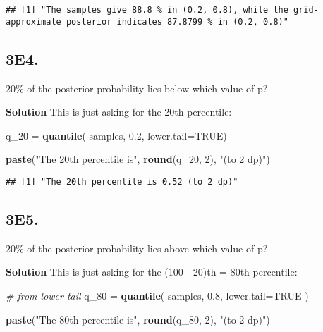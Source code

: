 \documentclass[
]{book}
\newenvironment{Shaded}{\begin{snugshade}}{\end{snugshade}}
\newcommand{\CommentTok}[1]{\textcolor[rgb]{0.56,0.35,0.01}{\textit{#1}}}
\newcommand{\DataTypeTok}[1]{\textcolor[rgb]{0.13,0.29,0.53}{#1}}
\newcommand{\DecValTok}[1]{\textcolor[rgb]{0.00,0.00,0.81}{#1}}
\newcommand{\FloatTok}[1]{\textcolor[rgb]{0.00,0.00,0.81}{#1}}
\newcommand{\KeywordTok}[1]{\textcolor[rgb]{0.13,0.29,0.53}{\textbf{#1}}}
\newcommand{\NormalTok}[1]{#1}
\newcommand{\OtherTok}[1]{\textcolor[rgb]{0.56,0.35,0.01}{#1}}
\newcommand{\StringTok}[1]{\textcolor[rgb]{0.31,0.60,0.02}{#1}}
\begin{document}
\begin{verbatim}
## [1] "The samples give 88.8 % in (0.2, 0.8), while the grid-approximate posterior indicates 87.8799 % in (0.2, 0.8)"
\end{verbatim}

\hypertarget{e4.}{%
\subsection{3E4.}\label{e4.}}

20\% of the posterior probability lies below which value of p?

\textbf{Solution}
This is just asking for the 20th percentile:

\begin{Shaded}
\begin{Highlighting}[]
\NormalTok{q_}\DecValTok{20}\NormalTok{ =}\StringTok{ }\KeywordTok{quantile}\NormalTok{( samples, }\FloatTok{0.2}\NormalTok{, }\DataTypeTok{lower.tail=}\OtherTok{TRUE}\NormalTok{)}

\KeywordTok{paste}\NormalTok{(}\StringTok{"The 20th percentile is"}\NormalTok{, }\KeywordTok{round}\NormalTok{(q_}\DecValTok{20}\NormalTok{, }\DecValTok{2}\NormalTok{), }\StringTok{"(to 2 dp)"}\NormalTok{) }
\end{Highlighting}
\end{Shaded}

\begin{verbatim}
## [1] "The 20th percentile is 0.52 (to 2 dp)"
\end{verbatim}

\hypertarget{e5.}{%
\subsection{3E5.}\label{e5.}}

20\% of the posterior probability lies above which value of p?

\textbf{Solution}
This is just asking for the (100 - 20)th = 80th percentile:

\begin{Shaded}
\begin{Highlighting}[]
\CommentTok{# from lower tail}
\NormalTok{q_}\DecValTok{80}\NormalTok{ =}\StringTok{ }\KeywordTok{quantile}\NormalTok{( samples, }\FloatTok{0.8}\NormalTok{, }\DataTypeTok{lower.tail=}\OtherTok{TRUE}\NormalTok{ )}

\KeywordTok{paste}\NormalTok{(}\StringTok{"The 80th percentile is"}\NormalTok{, }\KeywordTok{round}\NormalTok{(q_}\DecValTok{80}\NormalTok{, }\DecValTok{2}\NormalTok{), }\StringTok{"(to 2 dp)"}\NormalTok{) }
\end{Highlighting}
\end{Shaded}
\end{document}
